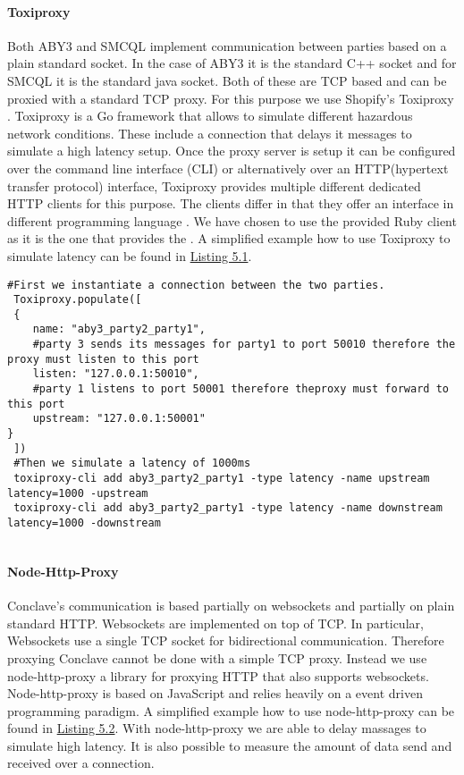  \paragraph{Toxiproxy}
 Both ABY3 and SMCQL implement communication between parties based on a plain standard socket. In the case of ABY3 it is the standard C++ socket and for SMCQL it is the standard java socket. Both of these are TCP based and can be proxied with a standard TCP proxy. For this purpose we use Shopify's Toxiproxy \cite{toxiproxy}. Toxiproxy is a Go framework that allows to simulate different hazardous network conditions. These include a connection that delays it messages to simulate a high latency setup. Once the proxy server is setup it can be configured over the command line interface (CLI) or alternatively over an HTTP(hypertext transfer protocol) interface, Toxiproxy provides multiple different dedicated HTTP clients for this purpose. The clients differ in that they offer an interface in different programming language . We have chosen to use the provided Ruby client as it is the one that provides the  . 
 A simplified example how to use Toxiproxy to simulate latency can be found in \hyperref[the_label]{Listing 5.1}. 
 
 \label{Toxi_label}				
 \begin{lstlisting}[caption={Setting up a proxy that simulates latency between two parties with Toxiporxy}]
 #First we instantiate a connection between the two parties. 
 Toxiproxy.populate([
 {
 	name: "aby3_party2_party1",
 	#party 3 sends its messages for party1 to port 50010 therefore the proxy must listen to this port
 	listen: "127.0.0.1:50010",   
 	#party 1 listens to port 50001 therefore theproxy must forward to this port
 	upstream: "127.0.0.1:50001"  
}
 ])
 #Then we simulate a latency of 1000ms 
 toxiproxy-cli add aby3_party2_party1 -type latency -name upstream latency=1000 -upstream
 toxiproxy-cli add aby3_party2_party1 -type latency -name downstream latency=1000 -downstream
 
 \end{lstlisting}
 \paragraph{Node-Http-Proxy}
 Conclave's communication is based partially on websockets and partially on plain standard HTTP.
 Websockets are implemented on top of TCP. In particular, Websockets use a single TCP socket for bidirectional communication. Therefore proxying Conclave cannot be done with a simple TCP proxy. Instead we use node-http-proxy a library for proxying HTTP that also supports websockets. Node-http-proxy is based on JavaScript and relies heavily on a event driven programming paradigm. A simplified example how to use node-http-proxy can be found in \hyperref[the_label]{Listing 5.2}. With node-http-proxy we are able to delay massages to simulate high latency. It is also possible to measure the amount of data send and received over a connection.
 
